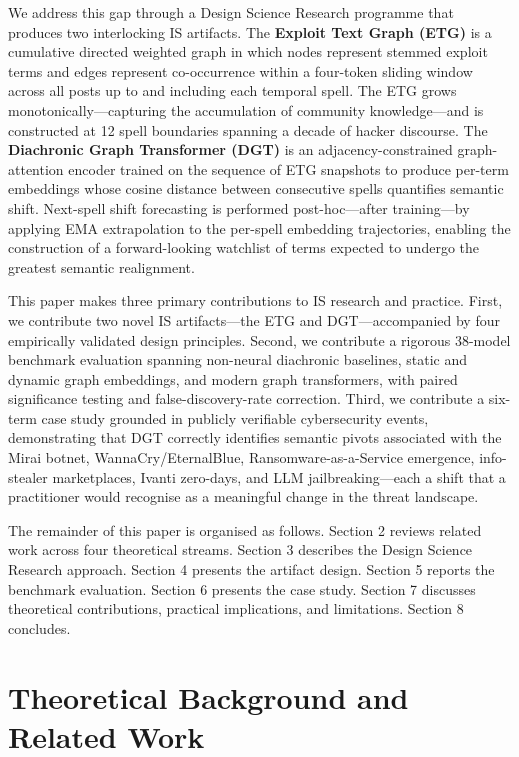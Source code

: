 \documentclass[12pt]{article}
\begin{document}
We address this gap through a Design Science Research \parencite{hevner2004, peffers2007} programme that produces two interlocking IS artifacts. The \textbf{Exploit Text Graph (ETG)} is a cumulative directed weighted graph in which nodes represent stemmed exploit terms and edges represent co-occurrence within a four-token sliding window across all posts up to and including each temporal spell. The ETG grows monotonically---capturing the accumulation of community knowledge---and is constructed at 12 spell boundaries spanning a decade of hacker discourse. The \textbf{Diachronic Graph Transformer (DGT)} is an adjacency-constrained graph-attention encoder trained on the sequence of ETG snapshots to produce per-term embeddings whose cosine distance between consecutive spells quantifies semantic shift. Next-spell shift forecasting is performed post-hoc---after training---by applying EMA extrapolation to the per-spell embedding trajectories, enabling the construction of a forward-looking watchlist of terms expected to undergo the greatest semantic realignment.

This paper makes three primary contributions to IS research and practice. First, we contribute two novel IS artifacts---the ETG and DGT---accompanied by four empirically validated design principles. Second, we contribute a rigorous 38-model benchmark evaluation spanning non-neural diachronic baselines, static and dynamic graph embeddings, and modern graph transformers, with paired significance testing and false-discovery-rate correction. Third, we contribute a six-term case study grounded in publicly verifiable cybersecurity events, demonstrating that DGT correctly identifies semantic pivots associated with the Mirai botnet, WannaCry/EternalBlue, Ransomware-as-a-Service emergence, info-stealer marketplaces, Ivanti zero-days, and LLM jailbreaking---each a shift that a practitioner would recognise as a meaningful change in the threat landscape.

The remainder of this paper is organised as follows. Section 2 reviews related work across four theoretical streams. Section 3 describes the Design Science Research approach. Section 4 presents the artifact design. Section 5 reports the benchmark evaluation. Section 6 presents the case study. Section 7 discusses theoretical contributions, practical implications, and limitations. Section 8 concludes.

\section{Theoretical Background and Related Work}
\bodyfont
\end{document}
